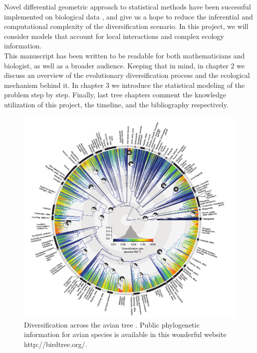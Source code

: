  
Novel differential geometric approach to statistical methods have been successful implemented on biological data \cite{augugliaro2013differential}\cite{abegaz2013sparse}, and give us a hope to reduce the inferential and computational complexity of the diversification scenario. In this project, we will consider models that account for local interactions and complex ecology information. \\
 
 
This manuscript has been written to be readable for both mathematicians and biologist, as well as a broader audience. Keeping that in mind, in chapter 2 we discuss an overview of the evolutionary diversification process and the ecological mechanism behind it. In chapter 3 we introduce the statistical modeling of the problem step by step. Finally, last tree chapters comment the knowledge utilization of this project, the timeline, and the bibliography respectively. 






 \begin{figure}
\centering
\includegraphics[scale=0.55]{Pictures/birds.png}
\caption{Diversification across the avian tree \cite{jetz2012global}. Public phylogenetic information for avian species is available in this wonderful website http://birdtree.org/.}
\label{avian}
\end{figure}

